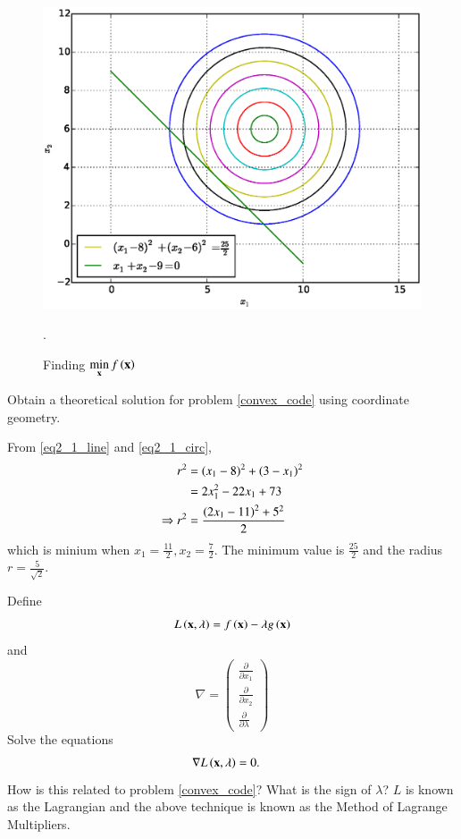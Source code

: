 \documentclass[journal,12pt,twocolumn]{IEEEtran}
\begin{document}
%
\begin{figure}[h]
\centering
\includegraphics[width=\columnwidth]{./figs/2.1.eps}
\caption{ Finding $ \displaystyle \min_{\mathbf{x}}f\left(\mathbf{x}\right)$}.
\label{fig.2.1}	
\end{figure}
%
\begin{problem}
Obtain a theoretical solution for problem \ref{convex_code} using coordinate geometry.
\end{problem}
\solution 
From \eqref{eq2_1_line} and \eqref{eq2_1_circ}, 
%
\begin{align}
r^2 & = (x_1-8)^2 + (3- x_1)^2 \\
&= 2 x_1^2 - 22 x_1 + 73 \\
\Rightarrow r^2 &= \frac{\left(2x_1-11\right)^2 + 5^2}{2}
\end{align}
%
which is minium when $x_1 = \frac{11}{2}, x_2 = \frac{7}{2}$.  The minimum value is $\frac{25}{2}$ and 
the radius $r = \frac{5}{\sqrt{2}}$.
\begin{problem}
\label{lagrange}
	Define 
	\begin{equation}
	\label{lagrangian}
	L\brak{\mbf{x},\lambda} = f\brak{\mbf{x}} - \lambda g\brak{\mbf{x}}%
	\end{equation}
and
\begin{equation}
\nabla =  
\begin{pmatrix}
\frac{\partial}{\partial x_1} \\
\frac{\partial}{\partial x_2} \\
\frac{\partial}{\partial \lambda} 
\end{pmatrix}
\end{equation}
Solve the equations
%
\begin{align}
\nabla L\left(\mathbf{x},\lambda\right) &= 0.
\label{tangent}
\end{align}
%
How is this related to problem \ref{convex_code}? What is the sign of $\lambda$?  $L$ is known as the Lagrangian and the above technique is known as the Method of Lagrange Multipliers.
\end{problem}
\end{document}
